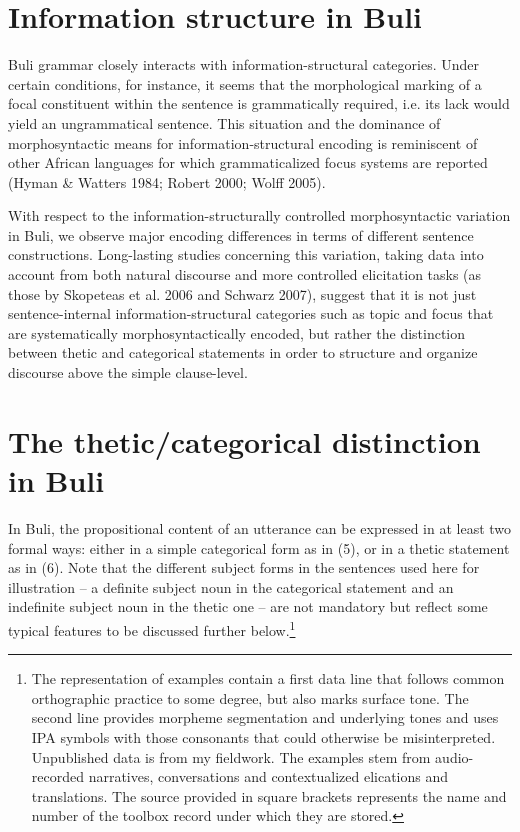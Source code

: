 \documentclass[output=paper]{langsci/langscibook}
\begin{document}
\section{ Information structure in Buli}

Buli grammar closely interacts with information-structural categories. Under certain conditions, for instance, it seems that the morphological marking of a focal constituent within the sentence is grammatically required, i.e. its lack would yield an ungrammatical sentence. This situation and the dominance of morphosyntactic means for information-structural encoding is reminiscent of other African languages for which grammaticalized focus systems are reported (Hyman \& Watters 1984; Robert 2000; Wolff 2005). 

With respect to the information-structurally controlled morphosyntactic variation in Buli, we observe major encoding differences in terms of different sentence constructions. Long-lasting studies concerning this variation, taking data into account from both natural discourse and more controlled elicitation tasks (as those by Skopeteas et al. 2006 and Schwarz 2007), suggest that it is not just sentence-internal information-structural categories such as topic and focus that are systematically morphosyntactically encoded, but rather the distinction between thetic and categorical statements in order to structure and organize discourse above the simple clause-level. 

\section{The thetic/categorical distinction in Buli}

In Buli, the propositional content of an utterance can be expressed in at least two formal ways: either in a simple categorical form as in (5), or in a thetic statement as in (6). Note that the different subject forms in the sentences used here for illustration – a definite subject noun in the categorical statement and an indefinite subject noun in the thetic one – are not mandatory but reflect some typical features to be discussed further below.\footnote{ The representation of examples contain a first data line that follows common orthographic practice to some degree, but also marks surface tone. The second line provides morpheme segmentation and underlying tones and uses IPA symbols with those consonants that could otherwise be misinterpreted. Unpublished data is from my fieldwork. The examples stem from audio-recorded narratives, conversations and contextualized elications and translations. The source provided in square brackets represents the name and number of the toolbox record under which they are stored.} 
\end{document}
